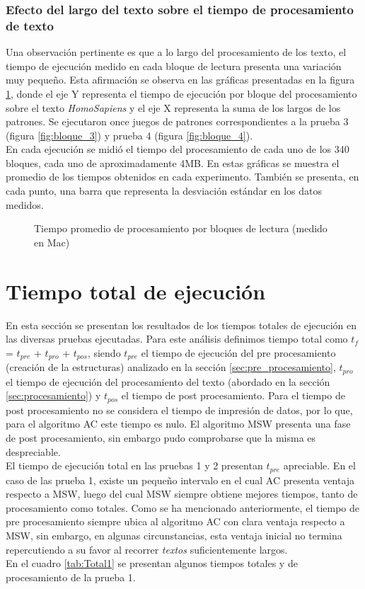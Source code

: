 {\subsubsection{Efecto del largo del texto sobre el tiempo de procesamiento de texto}
Una observación pertinente es que a lo largo del procesamiento de los texto, el tiempo de ejecución medido en cada bloque de lectura presenta una variación muy pequeño. Esta afirmación se observa en las gráficas presentadas en la figura \ref{fig:bloques_procesados}, donde el eje Y representa el tiempo de ejecución por bloque del procesamiento sobre el texto {\it HomoSapiens} y el eje X representa la suma de los largos de los patrones. Se ejecutaron once juegos de patrones correspondientes a la prueba 3 (figura \ref{fig:bloque_3}) y prueba 4 (figura \ref{fig:bloque_4}).\\
En cada ejecución se midió el tiempo del procesamiento de cada uno de los 340 bloques, cada uno de aproximadamente 4MB. En estas gráficas se muestra el promedio de los tiempos obtenidos en cada experimento. También se presenta, en cada punto, una barra que representa la desviación estándar en los datos medidos.
\begin{figure}[H]
\centering
\quad
\caption{Tiempo promedio de procesamiento por bloques de lectura (medido en Mac)}
\label{fig:bloques_procesados}
\end{figure}
\section{Tiempo total de ejecución}
En esta sección se presentan los resultados de los tiempos totales de ejecución en las diversas pruebas ejecutadas. 
Para este análisis definimos tiempo total como $t_{f}$ = $t_{pre}$ + $t_{pro}$ + $t_{pos}$, siendo $t_{pre}$ el tiempo de ejecución del pre procesamiento (creación de la estructuras) analizado en la sección \ref{sec:pre_procesamiento}, $t_{pro}$ el tiempo de ejecución del procesamiento del texto (abordado en la sección \ref{sec:procesamiento}) y  $t_{pos}$ el tiempo de post procesamiento. Para el tiempo de post procesamiento no se considera el tiempo de impresión de datos, por lo que, para el algoritmo AC este tiempo es nulo. El algoritmo MSW presenta una fase de post procesamiento, sin embargo pudo comprobarse que la misma es despreciable.\\ 
El tiempo de ejecución total en las pruebas 1 y 2 presentan $t_{pre}$ apreciable. En el caso de las prueba 1, existe un pequeño intervalo en el cual AC presenta ventaja respecto a MSW, luego del cual MSW siempre obtiene mejores tiempos, tanto de procesamiento como totales. Como se ha mencionado anteriormente, el tiempo de pre procesamiento siempre ubica al algoritmo AC con clara ventaja respecto a MSW, sin embargo, en algunas circunstancias, esta ventaja inicial no termina repercutiendo a su favor al recorrer \emph{textos} suficientemente largos. \\
En el cuadro \ref{tab:Total1} se presentan algunos tiempos totales y de procesamiento de la prueba 1. 

}
